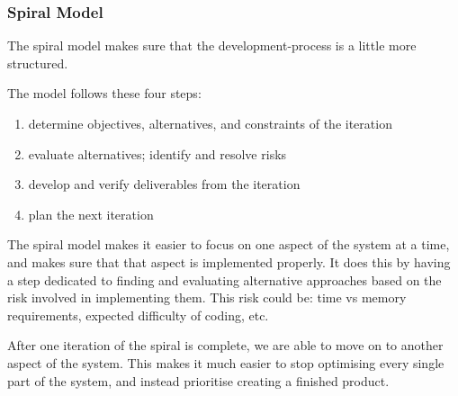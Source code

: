 \documentclass[conference]{IEEEtran}
\begin{document}
\subsubsection{Spiral Model}
The spiral model makes sure that the development-process is a little more structured.

The model follows these four steps:
\begin{enumerate}
	\item determine objectives, alternatives, and constraints of the iteration
	\item evaluate alternatives; identify and resolve risks
	\item develop and verify deliverables from the iteration
	\item plan the next iteration
\end{enumerate}

The spiral model makes it easier to focus on one aspect of the system at a time, and makes sure that that aspect is implemented properly. It does this by having a step dedicated to finding and evaluating alternative approaches based on the risk involved in implementing them. This risk could be: time vs memory requirements, expected difficulty of coding, etc.

After one iteration of the spiral is complete, we are able to move on to another aspect of the system. This makes it much easier to stop optimising every single part of the system, and instead prioritise creating a finished product.
\end{document}
